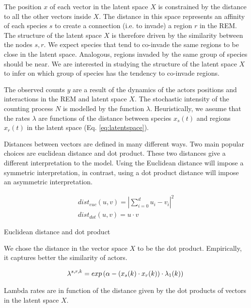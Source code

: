 \documentclass[mscthesis]{usiinfthesis}
\begin{document}
The position $x$ of each vector in the latent space $X$ is constrained by the distance to all the other vectors inside $X$. The distance in this space represents an affinity of each species $s$ to create a connection (i.e. to invade) a region $r$ in the REM. The structure of the latent space $X$ is therefore driven by the similarity between the nodes $s, r$. We expect species that tend to co-invade the same regions to be close in the latent space. Analogous, regions invaded by the same group of species should be near. We are interested in studying the structure of the latent space $X$ to infer on which group of species has the tendency to co-invade regions.


The observed counts $y$ are a result of the dynamics of the actors positions and interactions in the REM and latent space $X$. The stochastic intensity of the counting process $N$ is modelled by the function $\lambda$. Heuristically, we assume that the rates $\lambda$ are functions of the distance between species $x_s(t)$ and regions $x_r(t)$ in the latent space (Eq. \ref{eq:latentspace}). 

Distances between vectors are defined in many different ways. Two main popular choices are euclidean distance and dot product. These two distances give a different interpretation to the model. Using the Euclidean distance will impose a symmetric interpretation, in contrast, using a dot product distance will impose an asymmetric interpretation.

\begin{eqfloat}
\begin{equation}
\begin{array}{l}
dist_{euc}(u, v) = |\sum_{i=0}^d u_i - v_i|^2 \\
dist_{dot}(u, v) = u \cdot v
\end{array}
\label{eq:distance_latentspace}
\end{equation}
\caption{Euclidean distance and dot product}
\end{eqfloat}

We chose the distance in the vector space $X$ to be the dot product. Empirically, it captures better the similarity of actors.

\begin{eqfloat}
\begin{equation}
\lambda^{s, r, k} = exp\left(\alpha-(x_s(k) \cdot x_r(k)) \cdot \lambda_1(k) \right) \\
\label{eq:ourmodel_lambda}
\end{equation}
\caption{Lambda rates are in function of the distance given by the dot products of vectors in the latent space $X$.}
\end{eqfloat}
\end{document}
